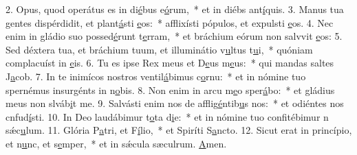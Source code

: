 2. Opus, quod operátus es in di\uline{é}bus e\uline{ó}rum,~* et in diébs ant\uline{í}quis.
3. Manus tua gentes dispérdidit, et plant\uline{á}sti \uline{e}os:~* afflixísti pópulos, et expulsti \uline{e}os.
4. Nec enim in gládio suo possed\uline{é}runt t\uline{e}rram,~* et bráchium eórum non salvvit \uline{e}os:
5. Sed déxtera tua, et bráchium tuum, et illuminátio v\uline{u}ltus t\uline{u}i,~* quóniam complacuíst in \uline{e}is.
6. Tu es ipse Rex meus et D\uline{e}us m\uline{e}us:~* qui mandas saltes J\uline{a}cob.
7. In te inimícos nostros ventil\uline{á}bimus c\uline{o}rnu:~* et in nómine tuo spernémus insurgénts in n\uline{o}bis.
8. Non enim in arcu m\uline{e}o sper\uline{á}bo:~* et gládius meus non slváb\uline{i}t me.
9. Salvásti enim nos de afflig\uline{é}ntib\uline{u}s nos:~* et odiéntes nos cnfud\uline{í}sti.
10. In Deo laudábimur t\uline{o}ta d\uline{i}e:~* et in nómine tuo confitébimur n sǽc\uline{u}lum.
11. Glória P\uline{a}tri, et F\uline{í}lio,~* et Spiríti S\uline{a}ncto.
12. Sicut erat in princípio, et n\uline{u}nc, et s\uline{e}mper,~* et in sǽcula sæculrum. \uline{A}men.
